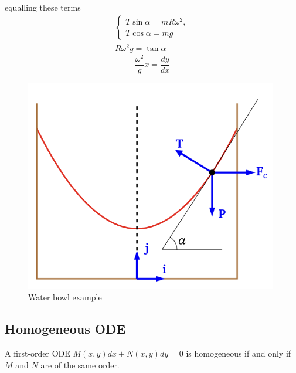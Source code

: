 \documentclass[a4paper]{article}
\begin{document}
\begin{minipage}{0.4\textwidth}
equalling these terms
\begin{align}
\begin{cases}
T\sin \alpha=mR\omega^{2}, \\
T\cos \alpha=mg
\end{cases} \\
R\omega^{2}g=\tan \alpha
\end{align}
$$
\boxed{\frac{\omega^{2}}{g}x=\frac{dy}{dx}}
$$
\end{minipage} \hfill \begin{minipage}{0.4\linewidth}
\begin{figure}[H]
    \centering
    \includegraphics[width=\textwidth]{IMG/ex_water.png}
    \caption{Water bowl example}
    \label{fig:ex_water}
\end{figure}
\end{minipage}



\subsection{Homogeneous ODE}
\setcounter{equation}{0}

\vspace{1ex}\vspace{1ex}

A first-order ODE $M(x,y)dx+N(x,y)dy=0$ is homogeneous if and only if $M$ and $N$ are of the same order.
\end{document}
